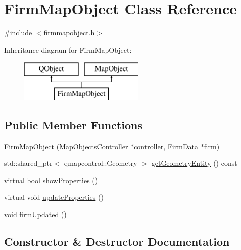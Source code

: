 \hypertarget{class_firm_map_object}{}\section{Firm\+Map\+Object Class Reference}
\label{class_firm_map_object}


{\ttfamily \#include $<$firmmapobject.\+h$>$}

Inheritance diagram for Firm\+Map\+Object\+:\begin{figure}[H]
\begin{center}
\leavevmode
\includegraphics[height=2.000000cm]{d9/d75/class_firm_map_object}
\end{center}
\end{figure}
\subsection*{Public Member Functions}
\begin{DoxyCompactItemize}
\item 
\mbox{\hyperlink{class_firm_map_object_af6fc930d785c83421844a12fcbab90d4}{Firm\+Map\+Object}} (\mbox{\hyperlink{class_map_objects_controller}{Map\+Objects\+Controller}} $\ast$controller, \mbox{\hyperlink{class_firm_data}{Firm\+Data}} $\ast$firm)
\item 
std\+::shared\+\_\+ptr$<$ qmapcontrol\+::\+Geometry $>$ \mbox{\hyperlink{class_firm_map_object_abdbe45cc9a667c24034d9830d452d8c8}{get\+Geometry\+Entity}} () const
\item 
virtual bool \mbox{\hyperlink{class_firm_map_object_a61a442f9a8afc283bdf659a63f092ff5}{show\+Properties}} ()
\item 
virtual void \mbox{\hyperlink{class_firm_map_object_a565930e0db830d0f03a49f74f99eb61f}{update\+Properties}} ()
\item 
void \mbox{\hyperlink{class_firm_map_object_acd6d8f8e8c09bec7993d403b800db5ff}{firm\+Updated}} ()
\end{DoxyCompactItemize}


\subsection{Constructor \& Destructor Documentation}
\mbox{\label{class_firm_map_object_af6fc930d785c83421844a12fcbab90d4}} 
